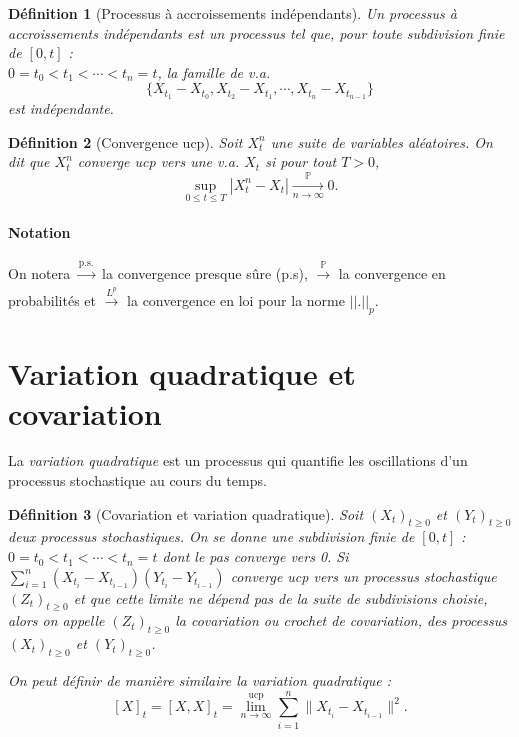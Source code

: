 \documentclass[openany]{book}
\renewcommand{\P}{\mathds{P}}
\newcommand{\1}{\mathbbm{1}}
\theoremstyle{thmfont}
\theoremstyle{deffont}
\newtheorem{definition}[definition]{Définition}
\theoremstyle{thmfont}
\theoremstyle{deffont}
\begin{document}
\begin{definition}[Processus à accroissements indépendants]
  \label{def:pr_accr_indep} Un processus à \textit{accroissements indépendants} est un processus tel que, pour toute subdivision finie de $[0,t]$ :\\  $0 = t_0 < t_1 < \cdots < t_n = t$, la famille de v.a.
    $$\{X_{t_1} - X_{t_0}, X_{t_2} - X_{t_1}, \cdots ,X_{t_n} - X_{t_{n-1}}\}$$
    est indépendante.
  \end{definition}

  \begin{definition}[Convergence ucp] Soit $X_t^n$ une suite de variables aléatoires. On dit que $X_t^n$ \textit{converge ucp} vers une v.a. $X_t$ si pour tout $T >0$, 
    $$\underset{0 \leq t \leq T}{\sup}|X_t^n - X_t| \xrightarrow[n \to \infty]{\P} 0.$$
  \end{definition}

  \paragraph{Notation}
  On notera $\xrightarrow[]{\text{p.s.}}$ la convergence presque sûre (p.s), $\xrightarrow[]{\P}$ la convergence en probabilités et $\xrightarrow[]{L^p}$ la convergence en loi pour la norme $||.||_p$.
    
\section{Variation quadratique et covariation}

La \textit{variation quadratique} est un processus qui quantifie les oscillations d'un processus stochastique au cours du temps. %

\begin{definition}[Covariation et variation quadratique] Soit $(X_t)_{t\geq0}$ et $(Y_t)_{t\geq0}$ deux processus stochastiques. 
  On se donne une subdivision finie de $[0,t]$ : $0 = t_0 < t_1 < \cdots < t_n = t$ dont le pas converge vers 0. Si $\sum_{i = 1}^n(X_{t_i} - X_{t_{i-1}})(Y_{t_i} - Y_{t_{i-1}})$ converge ucp vers un processus stochastique $(Z_t)_{t\geq0}$ et que cette limite ne dépend pas de la suite de subdivisions choisie, alors on appelle $(Z_t)_{t\geq0}$ la \textit{covariation} ou \textit{crochet de covariation}, des processus $(X_t)_{t\geq0}$ et $(Y_t)_{t\geq0}$.

 \noindent On peut définir de manière similaire la \textit{variation quadratique} :
 $$[X]_t = [X,X]_t = \lim_{n\to \infty}^{\text{ucp}} \sum_{i = 1}^n\|X_{t_i} - X_{t_{i-1}}\|^2.$$
\label{def:crochet}
\end{definition}
\end{document}
